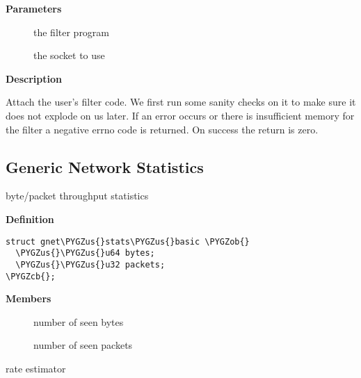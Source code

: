 \documentclass[a4paper,8pt,english]{sphinxmanual}
\def\PYGZus{\char`\_}
\def\PYGZob{\char`\{}
\def\PYGZcb{\char`\}}
\begin{document}
\textbf{Parameters}
\begin{description}
\item[{}] \leavevmode
the filter program

\item[{}] \leavevmode
the socket to use

\end{description}

\textbf{Description}

Attach the user's filter code. We first run some sanity checks on
it to make sure it does not explode on us later. If an error
occurs or there is insufficient memory for the filter a negative
errno code is returned. On success the return is zero.


\subsection{Generic Network Statistics}
\label{networking/kapi:generic-network-statistics}

\begin{fulllineitems}
\label{networking/kapi:c.gnet_stats_basic}
byte/packet throughput statistics

\end{fulllineitems}


\textbf{Definition}

\begin{Verbatim}[commandchars=\\\{\}]
struct gnet\PYGZus{}stats\PYGZus{}basic \PYGZob{}
  \PYGZus{}\PYGZus{}u64 bytes;
  \PYGZus{}\PYGZus{}u32 packets;
\PYGZcb{};
\end{Verbatim}

\textbf{Members}
\begin{description}
\item[{}] \leavevmode
number of seen bytes

\item[{}] \leavevmode
number of seen packets

\end{description}

\begin{fulllineitems}
\label{networking/kapi:c.gnet_stats_rate_est}
rate estimator

\end{fulllineitems}
\end{document}
